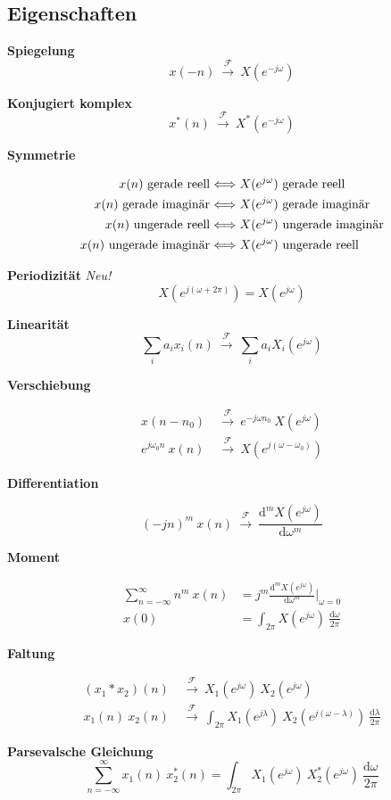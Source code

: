 \documentclass[10pt,a4paper]{article}
\newcommand{\fancyformula}[2]{
	\small
	\raggedright\sffamily\textbf{#1}
	#2
}
\newcommand{\ftransform}{
	~\xrightarrow{~\mathcal{F}~}~
}
\begin{document}
\subsection*{Eigenschaften}
\begin{multicols}{2}
	
\fancyformula{Spiegelung}{\[ x(-n)\ftransform X \left(e^{-j\omega} \right) \]}
\fancyformula{Konjugiert komplex}{\[ x^*(n) \ftransform X^* \left(e^{-j\omega} \right)\]}
\fancyformula{Symmetrie}{
\begin{align*}
	x(n) \textnormal{ gerade reell} &\Longleftrightarrow X(e^{j\omega}) \textnormal{ gerade reell} \\
	x(n) \textnormal{ gerade imaginär} &\Longleftrightarrow X(e^{j\omega}) \textnormal{ gerade imaginär} \\
	x(n) \textnormal{ ungerade reell} &\Longleftrightarrow X(e^{j\omega}) \textnormal{ ungerade imaginär} \\
	x(n) \textnormal{ ungerade imaginär} &\Longleftrightarrow X(e^{j\omega}) \textnormal{ ungerade reell} \\
\end{align*}
}
\fancyformula{Periodizität}{\textit{Neu!} \[ X \left(e^{j(\omega + 2\pi)}\right) = X(e^{j\omega}) \]}
\fancyformula{Linearität}{\[ \sum_{i} a_i x_i(n) \ftransform \sum_{i} a_i X_i\left(e^{j\omega} \right)\]}
\fancyformula{Verschiebung}{
\begin{align*}
	x(n - n_0) &\ftransform e^{-j\omega n_0} ~ X\left(e^{j\omega} \right) \\
	e^{j\omega_0 n} ~ x(n) &\ftransform X \left(e^{j (\omega - \omega_0)} \right)
\end{align*}
}
\fancyformula{Differentiation}{
\[
	(-jn)^m ~ x(n) \ftransform \frac{\mathrm d^m X(e^{j\omega})}{\mathrm d\omega^m}
\]
}
\fancyformula{Moment}{
\begin{align*}
	\sum_{n=-\infty}^{\infty} n^m ~ x(n) &= j^m \frac{\mathrm d^m X \left(e^{j\omega} \right)}{\mathrm d\omega^m} \bigg|_{\omega=0} \\
	x(0) &= \int_{2\pi} X \left(e^{j\omega} \right) ~ \frac{\mathrm d\omega}{2\pi}
\end{align*}	
}
\fancyformula{Faltung}{
\begin{align*}
	(x_1 \ast x_2)(n) &\ftransform X_1 \left(e^{j\omega} \right) ~ X_2 \left(e^{j\omega} \right)\\
	x_1(n) ~ x_2(n) &\ftransform \int_{2\pi} X_1 \left(e^{j\lambda} \right) ~ X_2 \left(e^{j (\omega - \lambda)} \right) ~ \frac{\mathrm d\lambda}{2\pi}
\end{align*}
}
\fancyformula{Parsevalsche Gleichung}{\[ \sum_{n=-\infty}^{\infty}x_1(n) ~ x_2^*(n) = \int_{2 \pi} X_1 \left(e^{j\omega} \right) ~ X_2^* \left(e^{j\omega} \right) ~ \frac{\mathrm d\omega}{2\pi} \]}
\end{multicols}
\end{document}
